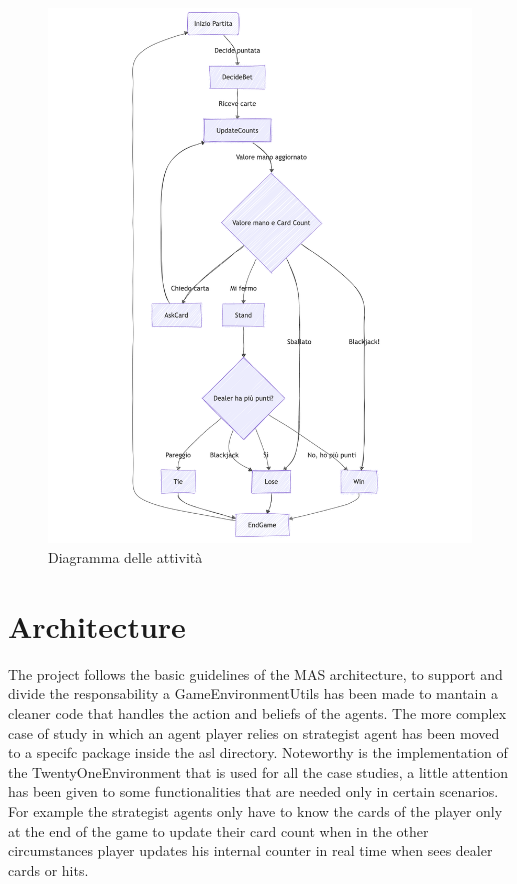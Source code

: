 \begin{figure}[!htb]
    \centering
    \includegraphics[scale=0.55]{report/img/activityDiagram.png}
    \caption{Diagramma delle attività}
    \label{fig:activityDiagram}
\end{figure}


\section{Architecture}

The project follows the basic guidelines of the MAS architecture, to support and divide the responsability a GameEnvironmentUtils has been made to mantain a cleaner code that handles the action and beliefs of the agents. The more complex case of study in which an agent player relies on strategist agent has been moved to a specifc package inside the asl directory. Noteworthy is the implementation of the TwentyOneEnvironment that is used for all the case studies, a little attention has been given to some functionalities that are needed only in certain scenarios. For example the strategist agents only have to know the cards of the player only at the end of the game to update their card count when in the other circumstances player updates his internal counter in real time when sees dealer cards or hits.


